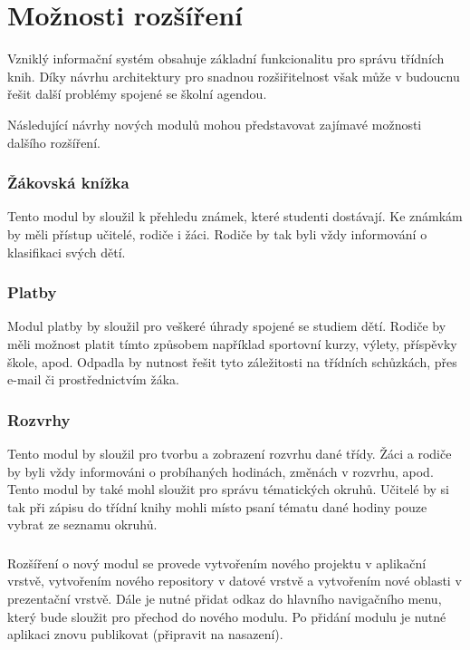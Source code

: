 \section{Možnosti rozšíření}
Vzniklý informační systém obsahuje základní funkcionalitu pro správu třídních knih. Díky návrhu architektury pro snadnou rozšiřitelnost však může v budoucnu řešit další problémy spojené se školní agendou.

Následující návrhy nových modulů mohou představovat zajímavé možnosti dalšího rozšíření.

\subsubsection*{Žákovská knížka}
Tento modul by sloužil k přehledu známek, které studenti dostávají. Ke známkám by měli přístup učitelé, rodiče i žáci. Rodiče by tak byli vždy informování o klasifikaci svých dětí.

\subsubsection*{Platby}
Modul platby by sloužil pro veškeré úhrady spojené se studiem dětí. Rodiče by měli možnost platit tímto způsobem například sportovní kurzy, výlety, příspěvky škole, apod. Odpadla by nutnost řešit tyto záležitosti na třídních schůzkách, přes e-mail či prostřednictvím žáka.

\subsubsection*{Rozvrhy}
Tento modul by sloužil pro tvorbu a zobrazení rozvrhu dané třídy. Žáci a rodiče by byli vždy informováni o probíhaných hodinách, změnách v rozvrhu, apod. Tento modul by také mohl sloužit pro správu tématických okruhů. Učitelé by si tak při zápisu do třídní knihy mohli místo psaní tématu dané hodiny pouze vybrat ze seznamu okruhů.

\subsubsection*{}
Rozšíření o nový modul se provede vytvořením nového projektu v aplikační vrstvě, vytvořením nového repository v datové vrstvě a vytvořením nové oblasti v prezentační vrstvě. Dále je nutné přidat odkaz do hlavního navigačního menu, který bude sloužit pro přechod do nového modulu. Po přidání modulu je nutné aplikaci znovu publikovat (připravit na nasazení).


